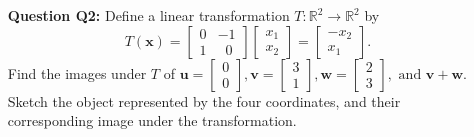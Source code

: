 \documentclass[a4paper,11pt,reqno]{amsart}
\numberwithin{equation}{section}
\begin{document}
\begin{enumerate}





\item[\textbf{Question Q2:}]
 Define a linear transformation \( T : \mathbb{R}^2 \to \mathbb{R}^2 \) by
    \[
    T(\mathbf{x})
    = 
    \begin{bmatrix}
        0 & -1\\
        1 &  \;\;0 
    \end{bmatrix} 
    \begin{bmatrix}
        x_1\\
        x_2
    \end{bmatrix}
    =
    \begin{bmatrix}
        -x_2\\
        x_1
    \end{bmatrix}.
    \]
    Find the images under \(T\) of 
    \(
    \mathbf{u}=
    \begin{bmatrix}
        0\\
        0
    \end{bmatrix},
    \mathbf{v}=
    \begin{bmatrix}
        3\\
        1
    \end{bmatrix},
    \mathbf{w}=
    \begin{bmatrix}
        2\\
        3
    \end{bmatrix}, \text{ and }
    \mathbf{v} + \mathbf{w}.
    \)
    Sketch the object represented by the four coordinates, and their corresponding image under the transformation.






\end{enumerate}
\end{document}
